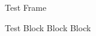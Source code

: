 \begin{frame}{Test Frame}
    \begin{block}{Test Block}
        Block
        \newline
        Block
    \end{block}
\end{frame}
